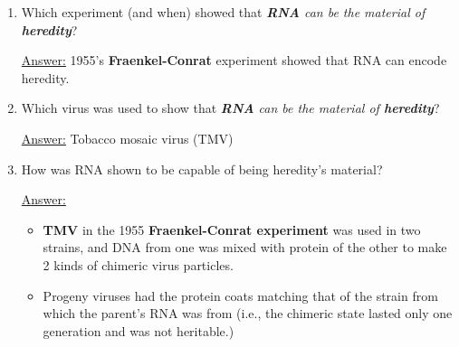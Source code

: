 \documentclass{article}
\newenvironment{QandA}{\begin{enumerate}[label=\bfseries Q\arabic*.]}
                       {\end{enumerate}}
\newenvironment{answered}{\par\normalfont\underline{Answer:}}{}
\begin{document}
\begin{QandA}
    \begin{answered}
    The Hershey-Chase experiment is nicknamed the  b/c of use of the blender to remove the phages from the bacteria.
    \end{answered}
  \item{Which experiment (and when) showed that \textit{\textbf{RNA} can be the material of \textbf{heredity}}?}
    \begin{answered}
    1955's \textbf{Fraenkel-Conrat} experiment showed that RNA can encode heredity.
    \end{answered}
  \item{Which virus was used to show that \textit{\textbf{RNA} can be the material of \textbf{heredity}}?}
    \begin{answered}
    Tobacco mosaic virus (TMV)
    \end{answered}
  \item{How was RNA shown to be capable of being heredity's material?}
    \begin{answered}
    \begin{itemize}
      \item{\textbf{TMV} in the 1955 \textbf{Fraenkel-Conrat experiment} was used in two strains, and DNA from one was mixed with protein of the other to make 2 kinds of chimeric virus particles.}
      \item{Progeny viruses had the protein coats matching that of the strain from which the parent's RNA was from (i.e., the chimeric state lasted only one generation and was not heritable.)}
    \end{itemize}
    \end{answered}
\end{QandA}
\end{document}
